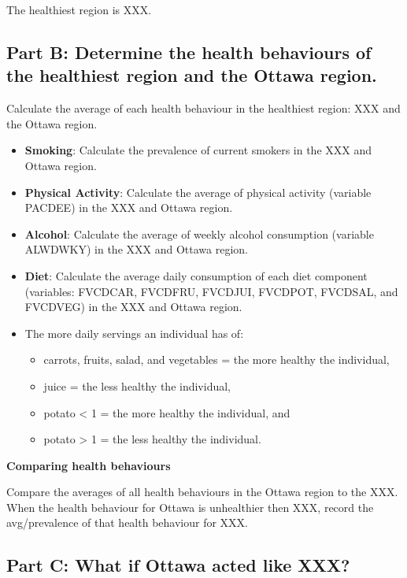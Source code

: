 \documentclass[]{book}
\providecommand{\tightlist}{%
  \setlength{\itemsep}{0pt}\setlength{\parskip}{0pt}}
\begin{document}
The healthiest region is XXX.

\subsection{Part B: Determine the health behaviours of the healthiest
region and the Ottawa
region.}\label{part-b-determine-the-health-behaviours-of-the-healthiest-region-and-the-ottawa-region.}

Calculate the average of each health behaviour in the healthiest region:
XXX and the Ottawa region.

\begin{itemize}
\item
  \textbf{Smoking}: Calculate the prevalence of current smokers in the
  XXX and Ottawa region.
\item
  \textbf{Physical Activity}: Calculate the average of physical activity
  (variable PACDEE) in the XXX and Ottawa region.
\item
  \textbf{Alcohol}: Calculate the average of weekly alcohol consumption
  (variable ALWDWKY) in the XXX and Ottawa region.
\item
  \textbf{Diet}: Calculate the average daily consumption of each diet
  component (variables: FVCDCAR, FVCDFRU, FVCDJUI, FVCDPOT, FVCDSAL, and
  FVCDVEG) in the XXX and Ottawa region.
\item
  The more daily servings an individual has of:

  \begin{itemize}
  \tightlist
  \item
    carrots, fruits, salad, and vegetables = the more healthy the
    individual,
  \item
    juice = the less healthy the individual,
  \item
    potato \textless{} 1 = the more healthy the individual, and
  \item
    potato \textgreater{} 1 = the less healthy the individual.
  \end{itemize}
\end{itemize}

\textbf{Comparing health behaviours}

Compare the averages of all health behaviours in the Ottawa region to
the XXX. When the health behaviour for Ottawa is unhealthier then XXX,
record the avg/prevalence of that health behaviour for XXX.

\subsection{Part C: What if Ottawa acted like
XXX?}\label{part-c-what-if-ottawa-acted-like-xxx}
\end{document}

